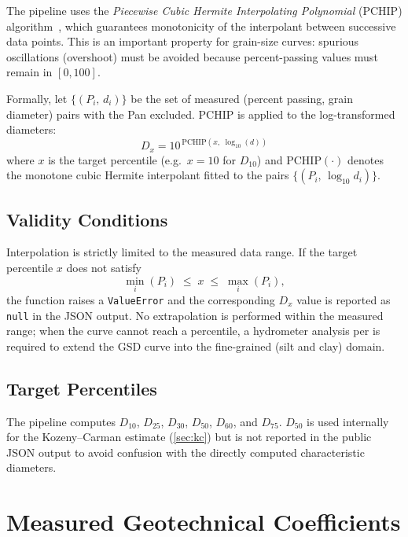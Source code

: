 \documentclass[12pt,a4paper]{article}
\begin{document}
The pipeline uses the \emph{Piecewise Cubic Hermite Interpolating Polynomial}
(PCHIP) algorithm~\citep{fritsch1980}, which guarantees monotonicity of the
interpolant between successive data points.  This is an important property
for grain-size curves: spurious oscillations (overshoot) must be avoided
because percent-passing values must remain in \([0, 100]\).

Formally, let $\{(P_i,\, d_i)\}$ be the set of measured (percent passing,
grain diameter) pairs with the Pan excluded.  PCHIP is applied to the
log-transformed diameters:
\begin{equation}
    D_x = 10^{\,\mathrm{PCHIP}\!\left(x,\;\log_{10}(d)\right)}
    \label{eq:pchip}
\end{equation}
where $x$ is the target percentile (e.g.\ $x = 10$ for $D_{10}$) and
$\mathrm{PCHIP}(\cdot)$ denotes the monotone cubic Hermite interpolant fitted
to the pairs $\{(P_i,\, \log_{10} d_i)\}$.

\subsection{Validity Conditions}

Interpolation is strictly limited to the measured data range.
If the target percentile $x$ does not satisfy
\begin{equation}
    \min_i(P_i) \;\le\; x \;\le\; \max_i(P_i),
    \label{eq:validity_range}
\end{equation}
the function raises a \texttt{ValueError} and the corresponding $D_x$ value is
reported as \texttt{null} in the JSON output.  No extrapolation is performed
within the measured range; when the curve cannot reach a percentile, a
hydrometer analysis per \citet{astm_d7928} is required to extend the GSD
curve into the fine-grained (silt and clay) domain.

\subsection{Target Percentiles}

The pipeline computes $D_{10}$, $D_{25}$, $D_{30}$, $D_{50}$, $D_{60}$, and
$D_{75}$.  $D_{50}$ is used internally for the Kozeny--Carman estimate
(\cref{sec:kc}) but is not reported in the public JSON output to avoid
confusion with the directly computed characteristic diameters.

\section{Measured Geotechnical Coefficients}
\label{sec:measured}
\end{document}
